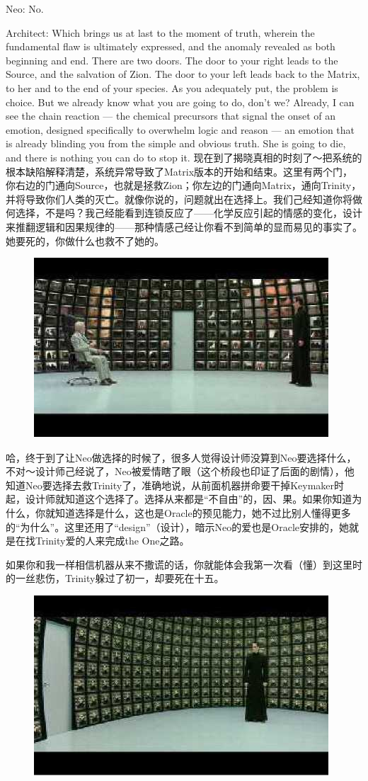 \documentclass[UTF8]{ctexart}
\begin{document}
Neo: No.

Architect: Which brings us at last to the moment of truth, wherein the fundamental flaw is ultimately expressed, and the anomaly revealed as both beginning and end. There are two doors. The door to your right leads to the Source, and the salvation of Zion. The door to your left leads back to the Matrix, to her and to the end of your species. As you adequately put, the problem is choice. But we already know what you are going to do, don’t we? Already, I can see the chain reaction --- the chemical precursors that signal the onset of an emotion, designed specifically to overwhelm logic and reason --- an emotion that is already blinding you from the simple and obvious truth. She is going to die, and there is nothing you can do to stop it. 现在到了揭晓真相的时刻了～把系统的根本缺陷解释清楚，系统异常导致了Matrix版本的开始和结束。这里有两个门，你右边的门通向Source，也就是拯救Zion；你左边的门通向Matrix，通向Trinity，并将导致你们人类的灭亡。就像你说的，问题就出在选择上。我们己经知道你将做何选择，不是吗？我己经能看到连锁反应了——化学反应引起的情感的变化，设计来推翻逻辑和因果规律的——那种情感己经让你看不到简单的显而易见的事实了。她要死的，你做什么也救不了她的。

\begin{figure}[htb]
\centering
\includegraphics[width=0.5\linewidth]{fig/read_reloaded-166}
\end{figure}

哈，终于到了让Neo做选择的时候了，很多人觉得设计师没算到Neo要选择什么，不对～设计师己经说了，Neo被爱情瞎了眼（这个桥段也印证了后面的剧情），他知道Neo要选择去救Trinity了，准确地说，从前面机器拼命要干掉Keymaker时起，设计师就知道这个选择了。选择从来都是“不自由”的，因、果。如果你知道为什么，你就知道选择是什么，这也是Oracle的预见能力，她不过比别人懂得更多的“为什么”。这里还用了“design”（设计），暗示Neo的爱也是Oracle安排的，她就是在找Trinity爱的人来完成the One之路。

如果你和我一样相信机器从来不撒谎的话，你就能体会我第一次看（懂）到这里时的一丝悲伤，Trinity躲过了初一，却要死在十五。

\begin{figure}[htb]
\centering
\includegraphics[width=0.5\linewidth]{fig/read_reloaded-168}
\end{figure}
\end{document}
